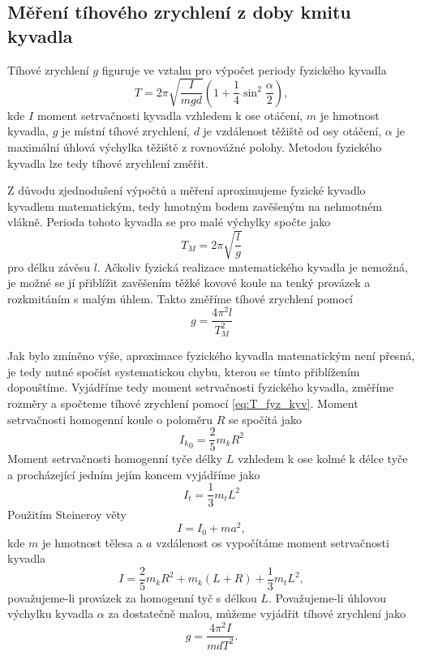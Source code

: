 \documentclass[protokol.tex]{subfiles}
\begin{document}
\subsection*{Měření tíhového zrychlení z doby kmitu kyvadla}
Tíhové zrychlení $g$ figuruje ve vztahu pro výpočet periody fyzického kyvadla
\begin{equation} \label{eq:T_fyz_kyv}
T = 2 \pi \sqrt{\frac{I}{mgd}}\left( 1 + \frac{1}{4} \sin^2 \frac{\alpha}{2} \right),
\end{equation}
kde $I$ moment setrvačnosti kyvadla vzhledem k ose otáčení, $m$ je hmotnost kyvadla, $g$ je  místní tíhové zrychlení, $d$ je  vzdálenost  těžiště od osy otáčení, $\alpha$ je maximální úhlová výchylka těžiště z rovnovážné polohy. Metodou fyzického kyvadla lze tedy tíhové zrychlení změřit.

Z důvodu zjednodušení výpočtů a měření aproximujeme fyzické kyvadlo kyvadlem matematickým, tedy hmotným bodem zavěšeným na nehmotném vlákně. Perioda tohoto kyvadla se pro malé výchylky spočte jako 
\begin{equation} \label{eq:T_mat_kyv}
T_M = 2 \pi \sqrt{\frac{l}{g}}
\end{equation}
pro délku závěsu $l$.
Ačkoliv fyzická realizace matematického kyvadla je nemožná, je možné se jí přiblížit zavěšením těžké kovové koule na tenký provázek a rozkmitáním s malým úhlem. Takto změříme tíhové zrychlení pomocí 
\begin{equation} \label{eq:g_mat_kyv}
g = \frac{4 \pi^2 l}{T_M^2}
\end{equation}

Jak bylo zmíněno výše, aproximace fyzického kyvadla matematickým není přesná, je tedy nutné spočíst systematickou chybu, kterou se tímto přiblížením dopouštíme. Vyjádříme tedy moment setrvačnosti fyzického kyvadla, změříme rozměry a spočteme tíhové zrychlení pomocí \eqref{eq:T_fyz_kyv}. Moment setrvačnosti homogenní koule o poloměru $R$ se spočítá jako 
\begin{equation} \label{eq:I_koule}
{I_k}_0 = \frac{2}{5} m_k R^2
\end{equation}
Moment setrvačnosti homogenní tyče délky $L$ vzhledem k ose kolmé k délce tyče a procházející jedním jejím koncem vyjádříme jako 
\begin{equation} \label{eq:I_tyce}
I_t = \frac{1}{3} m_t L^2
\end{equation}
Použitím Steineroy věty 
\begin{equation} \label{eq:steiner}
I = I_0 + ma^2,
\end{equation}
kde $m$ je hmotnost tělesa a $a$ vzdálenost os vypočítáme moment setrvačnosti kyvadla
\begin{equation} \label{eq:I_fyz_kyv}
I = \frac{2}{5} m_k R^2 + m_k \left( L + R \right) + \frac{1}{3} m_t L^2,
\end{equation}
považujeme-li provázek za homogenní tyč s délkou $L$. Považujeme-li úhlovou výchylku kyvadla $\alpha$ za dostatečně malou, můžeme vyjádřit tíhové zrychlení jako 
\begin{equation} \label{eq:g_fyz_kyv}
g = \frac{4 \pi^2 I}{m d T^2}.
\end{equation}
\end{document}

